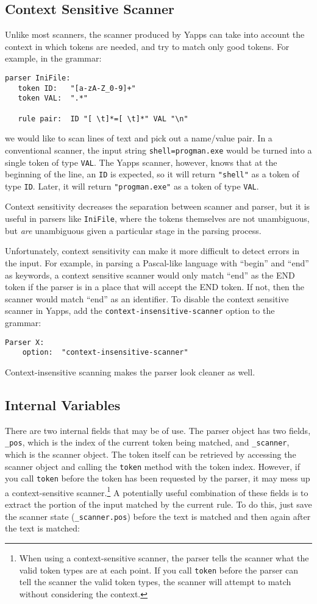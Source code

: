 \documentclass[10pt]{article}
\newcommand{\mysubsection}[1]{\subsection{#1}}
\begin{document}
\mysubsection{Context Sensitive Scanner}

Unlike most scanners, the scanner produced by Yapps can take into
account the context in which tokens are needed, and try to match only
good tokens.  For example, in the grammar:

\begin{verbatim}
parser IniFile:
   token ID:   "[a-zA-Z_0-9]+"
   token VAL:  ".*"

   rule pair:  ID "[ \t]*=[ \t]*" VAL "\n"
\end{verbatim}

we would like to scan lines of text and pick out a name/value pair.
In a conventional scanner, the input string \texttt{shell=progman.exe}
would be turned into a single token of type \texttt{VAL}.  The Yapps
scanner, however, knows that at the beginning of the line, an
\texttt{ID} is expected, so it will return \texttt{"shell"} as a token
of type \texttt{ID}.  Later, it will return \texttt{"progman.exe"} as
a token of type \texttt{VAL}.

Context sensitivity decreases the separation between scanner and
parser, but it is useful in parsers like \texttt{IniFile}, where the
tokens themselves are not unambiguous, but \emph{are} unambiguous
given a particular stage in the parsing process.

Unfortunately, context sensitivity can make it more difficult to
detect errors in the input.  For example, in parsing a Pascal-like
language with ``begin'' and ``end'' as keywords, a context sensitive
scanner would only match ``end'' as the END token if the parser is in
a place that will accept the END token.  If not, then the scanner
would match ``end'' as an identifier.  To disable the context
sensitive scanner in Yapps, add the
\texttt{context-insensitive-scanner} option to the grammar:

\begin{verbatim}
Parser X:
    option:  "context-insensitive-scanner"
\end{verbatim}

Context-insensitive scanning makes the parser look cleaner as well.

\mysubsection{Internal Variables}

There are two internal fields that may be of use.  The parser object
has two fields, \texttt{\_pos}, which is the index of the current
token being matched, and \texttt{\_scanner}, which is the scanner
object.  The token itself can be retrieved by accessing the scanner
object and calling the \texttt{token} method with the token index.  However, if you call \texttt{token} before the token has been requested by the parser, it may mess up a context-sensitive scanner.\footnote{When using a context-sensitive scanner, the parser tells the scanner what the valid token types are at each point.  If you call \texttt{token} before the parser can tell the scanner the valid token types, the scanner will attempt to match without considering the context.}  A
potentially useful combination of these fields is to extract the
portion of the input matched by the current rule.  To do this, just save the scanner state (\texttt{\_scanner.pos}) before the text is matched and then again after the text is matched:
\end{document}
